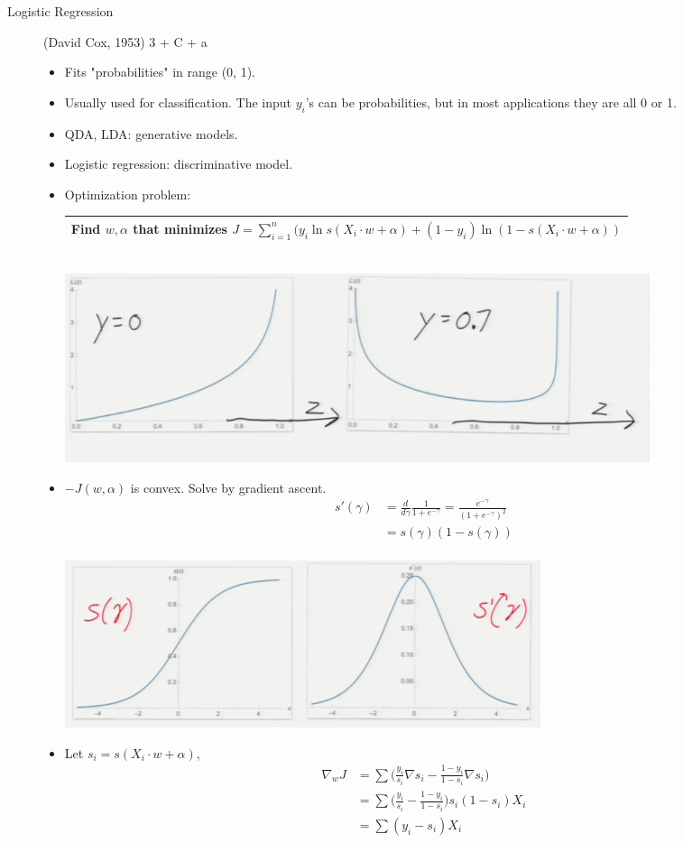 \documentclass[10pt]{article}
\begin{document}
\begin{description}
	\item[Logistic Regression] (David Cox, 1953) 3 + C + a
		\begin{itemize}
			\item Fits "probabilities" in range (0, 1).
			\item Usually used for classification. The input $y_{i}$'s can be probabilities, but in most applications they are all 0 or 1.
			\item QDA, LDA: generative models.
			\item Logistic regression: discriminative model.
			\item Optimization problem:
				\begin{center}
					\begin{tabular}{|c|}
					\hline
						Find $w, \alpha$ that minimizes $J = \sum_{i=1}^{n}(y_{i} \ln s(X_{i} \cdot w + \alpha) + (1-y_{i}) \ln (1 - s(X_{i} \cdot w + \alpha))$\\
						\hline
					\end{tabular}\\
					[1em]
					\includegraphics[scale=0.5]{images/logistics}
				\end{center}
			\item $-J(w, \alpha)$ is convex. Solve by gradient ascent.
			\begin{align*}
				s'(\gamma) &= \frac{d}{d\gamma} \frac{1}{1 + e^{-\gamma}} = \frac{e^{-\gamma}}{(1 + e^{-\gamma})^{2}}\\
				&= s(\gamma)(1 - s(\gamma))\\
			\end{align*}
			\begin{center}
				\includegraphics[scale=0.5]{images/gradients}
			\end{center}
			\item Let $s_{i} = s(X_{i}\cdot w + \alpha)$,
			\begin{align*}
				\nabla_{w} J &= \sum\Big(\frac{y_{i}}{s_{i}}\nabla s_{i} - \frac{1-y_{i}}{1 - s_{i}} \nabla s_{i}\Big)\\
					&= \sum \Big(\frac{y_{i}}{s_{i}} - \frac{1-y_{i}}{1 - s_{i}}\Big) s_{i} (1 - s_{i})X_{i}\\
					&= \sum (y_{i} - s_{i})X_{i}
			\end{align*}
			

\end{itemize}
\end{description}
\end{document}

